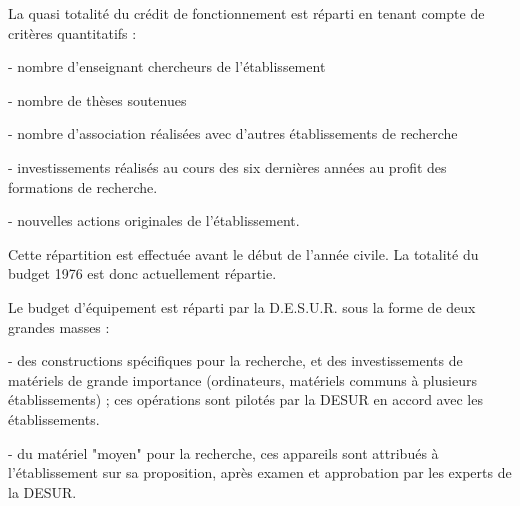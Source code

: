 

La quasi totalité du crédit de fonctionnement est réparti en tenant compte de critères quantitatifs :

- nombre d'enseignant chercheurs de l'établissement

- nombre de thèses soutenues

- nombre d'association réalisées avec d'autres établissements de recherche

- investissements réalisés au cours des six dernières années au profit des formations de recherche.

- nouvelles actions originales de l'établissement.

Cette répartition est effectuée avant le début de l'année civile. La totalité du budget 1976 est donc actuellement répartie.

Le budget d'équipement est réparti par la D.E.S.U.R. sous la forme de deux grandes masses :

- des constructions spécifiques pour la recherche, et des investissements de matériels de grande importance (ordinateurs, matériels communs à plusieurs établissements) ; ces opérations sont pilotés par la DESUR en accord avec les établissements.

- du matériel "moyen" pour la recherche, ces appareils sont attribués à l'établissement sur sa proposition, après examen et approbation par les experts de la DESUR.


